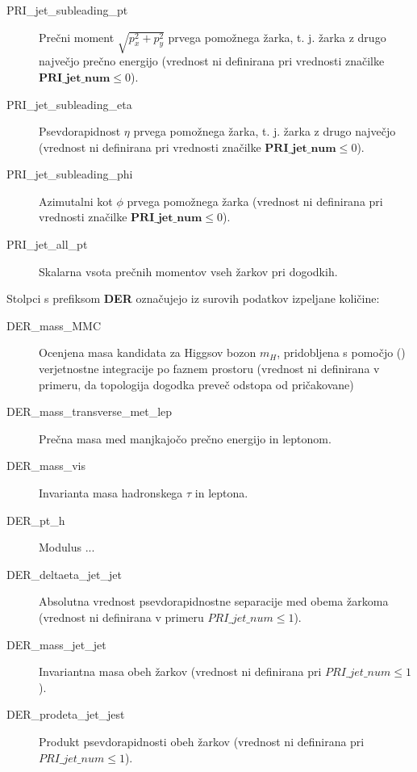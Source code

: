 \documentclass[11pt,a4paper,openany]{book}
\begin{document}
\begin{changemargin}{0.5cm}{0.0cm}
\begin{description}
	\item[PRI\_jet\_subleading\_pt] Prečni moment $\sqrt{p_x^2 + p_y^2}$ prvega pomožnega žarka, t. j. žarka z drugo največjo prečno energijo (vrednost ni definirana pri vrednosti značilke $\textbf{PRI\_jet\_num} \le 0$).
	\item[PRI\_jet\_subleading\_eta] Psevdorapidnost $\eta$ prvega pomožnega žarka, t. j. žarka z drugo največjo (vrednost ni definirana pri vrednosti značilke $\textbf{PRI\_jet\_num} \le 0$).
	\item[PRI\_jet\_subleading\_phi] Azimutalni kot $\phi$ prvega pomožnega žarka (vrednost ni definirana pri vrednosti značilke $\textbf{PRI\_jet\_num} \le 0$).
	
	\item[PRI\_jet\_all\_pt] Skalarna vsota prečnih momentov vseh žarkov pri dogodkih.
\end{description}
\end{changemargin}

Stolpci s prefiksom \textbf{DER} označujejo iz surovih podatkov izpeljane količine:
\begin{changemargin}{0.5cm}{0.0cm} 
\begin{description}
	\item[DER\_mass\_MMC] Ocenjena masa kandidata za Higgsov bozon $m_H$, pridobljena s pomočjo () verjetnostne integracije po faznem prostoru (vrednost ni definirana v primeru, da topologija dogodka preveč odstopa od pričakovane)
	\item[DER\_mass\_transverse\_met\_lep] Prečna masa med manjkajočo prečno energijo in leptonom.
	\item[DER\_mass\_vis] Invarianta masa hadronskega $\tau$ in leptona.
	\item[DER\_pt\_h] Modulus ... 
	\item[DER\_deltaeta\_jet\_jet] Absolutna vrednost psevdorapidnostne separacije med obema žarkoma (vrednost ni definirana v primeru $PRI\_jet\_num \le 1$).
	\item[DER\_mass\_jet\_jet] Invariantna masa obeh žarkov (vrednost ni definirana pri $PRI\_jet\_num \le 1$).
	\item[DER\_prodeta\_jet\_jest] Produkt psevdorapidnosti obeh žarkov (vrednost ni definirana pri $PRI\_jet\_num \le 1$).
	
\end{description}
\end{changemargin}

\end{document}

